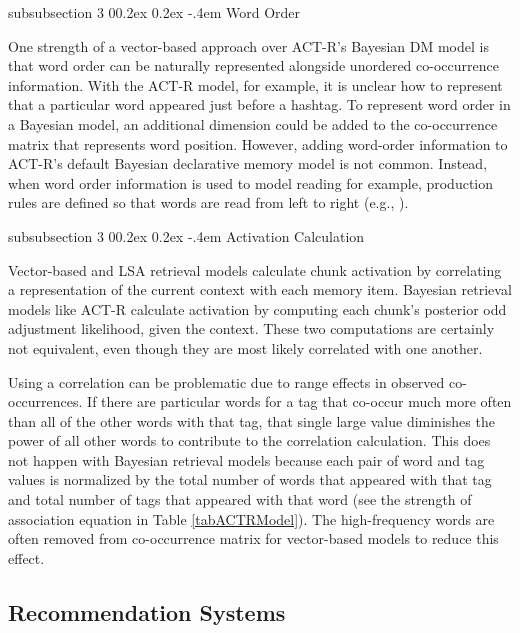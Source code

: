 \documentclass[man,floatsintext,donotrepeattitle]{apa6}
\makeatletter
\renewcommand{\subsubsection}{%
  \@startsection
  {subsubsection}%
  {3}%
  {\parindent}%
  {0\baselineskip \@plus 0.2ex \@minus 0.2ex}%
  {-.4em}%
  {\normalfont\normalsize\bfseries\addperi}}
\makeatother
\begin{document}
\subsubsection{Word Order}

One strength of a vector-based approach over ACT-R's Bayesian DM model is that word order can be naturally represented alongside unordered co-occurrence information.
With the ACT-R model, for example, it is unclear how to represent that a particular word appeared just before a hashtag. 
To represent word order in a Bayesian model, an additional dimension could be added to the co-occurrence matrix that represents word position.
However, adding word-order information to ACT-R's default Bayesian declarative memory model is not common.
Instead, when word order information is used to model reading for example, production rules are defined so that words are read from left to right (e.g., \textcite{Lewis2006}).

\subsubsection{Activation Calculation}

Vector-based and LSA retrieval models calculate chunk activation by correlating a representation of the current context with each memory item.
Bayesian retrieval models like ACT-R calculate activation by computing each chunk's posterior odd adjustment likelihood, given the context.
These two computations are certainly not equivalent, even though they are most likely correlated with one another.

Using a correlation can be problematic due to range effects in observed co-occurrences.
If there are particular words for a tag that co-occur much more often than all of the other words with that tag, that single large value diminishes the power of all other words to contribute to the correlation calculation.
This does not happen with Bayesian retrieval models because each pair of word and tag values is normalized by the total number of words that appeared with that tag and total number of tags that appeared with that word
(see the strength of association equation in Table \ref{tabACTRModel}).
The high-frequency words are often removed from co-occurrence matrix for vector-based models to reduce this effect.

\subsection{Recommendation Systems}
\end{document}
